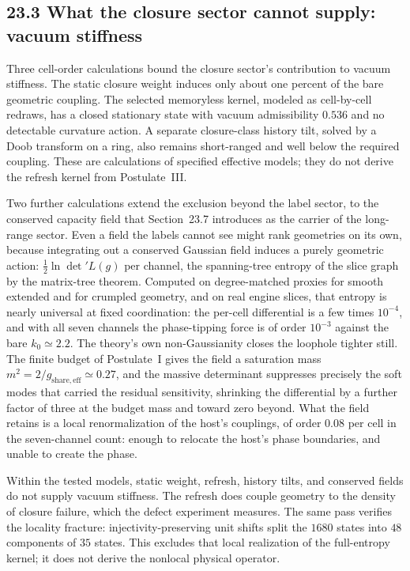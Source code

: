 \documentclass[11pt]{article}
\begin{document}
\subsection{23.3 What the closure sector cannot supply: vacuum stiffness}

Three cell-order calculations bound the closure sector's contribution to vacuum stiffness. The static closure weight induces only about one percent of the bare geometric coupling. The selected memoryless kernel, modeled as cell-by-cell redraws, has a closed stationary state with vacuum admissibility $0.536$ and no detectable curvature action. A separate closure-class history tilt, solved by a Doob transform on a ring, also remains short-ranged and well below the required coupling. These are calculations of specified effective models; they do not derive the refresh kernel from Postulate~III.

Two further calculations extend the exclusion beyond the label sector, to the conserved capacity field that Section~23.7 introduces as the carrier of the long-range sector. Even a field the labels cannot see might rank geometries on its own, because integrating out a conserved Gaussian field induces a purely geometric action: $\tfrac{1}{2}\ln\det'L(g)$ per channel, the spanning-tree entropy of the slice graph by the matrix-tree theorem. Computed on degree-matched proxies for smooth extended and for crumpled geometry, and on real engine slices, that entropy is nearly universal at fixed coordination: the per-cell differential is a few times $10^{-4}$, and with all seven channels the phase-tipping force is of order $10^{-3}$ against the bare $k_0\simeq2.2$. The theory's own non-Gaussianity closes the loophole tighter still. The finite budget of Postulate~I gives the field a saturation mass $m^2=2/g_{\mathrm{share,eff}}\simeq0.27$, and the massive determinant suppresses precisely the soft modes that carried the residual sensitivity, shrinking the differential by a further factor of three at the budget mass and toward zero beyond. What the field retains is a local renormalization of the host's couplings, of order $0.08$ per cell in the seven-channel count: enough to relocate the host's phase boundaries, and unable to create the phase.

Within the tested models, static weight, refresh, history tilts, and conserved fields do not supply vacuum stiffness. The refresh does couple geometry to the density of closure failure, which the defect experiment measures. The same pass verifies the locality fracture: injectivity-preserving unit shifts split the $1680$ states into $48$ components of $35$ states. This excludes that local realization of the full-entropy kernel; it does not derive the nonlocal physical operator.
\end{document}
